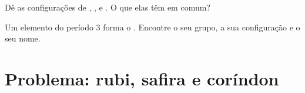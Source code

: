 \begin{exercise}[$\star\star\star$]\label{exo:g10:electron-shells:14}
Dê as configurações de , ,  e .
O que elas têm em comum?
\end{exercise}

\begin{exercise}[$\star\star\star$]\label{exo:g10:electron-shells:15}
Um elemento do período 3 forma o  . Encontre o seu grupo,
a sua configuração e o seu nome.
\end{exercise}

\section{Problema: rubi, safira e coríndon}

